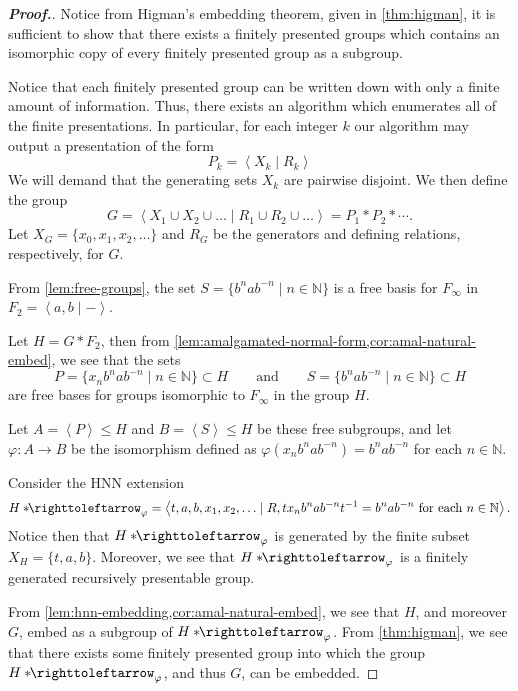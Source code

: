 \documentclass[11pt,a4paper,reqno]{amsart}
\theoremstyle{plain}
\theoremstyle{definition}
\theoremstyle{definition}
\renewcommand\leq\leqslant
\newenvironment{myproof}{\begin{proof}[\normalfont\bfseries Proof.]}{\end{proof}}
\newcommand\hnn{*\!\!\righttoleftarrow}
\begin{document}
\begin{myproof}
	Notice from Higman's embedding theorem, given in \cref{thm:higman}, it is sufficient to show that there exists a finitely presented groups which contains an isomorphic copy of every finitely presented group as a subgroup.

	Notice that each finitely presented group can be written down with only a finite amount of information.
	Thus, there exists an algorithm which enumerates all of the finite presentations.
	In particular, for each integer $k$ our algorithm may output a presentation of the form
	\[
		P_k = \left\langle X_k\mid R_k  \right\rangle
	\]
	We will demand that the generating sets $X_k$ are pairwise disjoint.
	We then define the group
	\[
		G = \left\langle
		X_1 \cup X_2 \cup \ldots
		\mid
		R_1 \cup R_2\cup\ldots
		\right\rangle = P_1 * P_2 * \cdots.
	\]
  Let $X_G = \{x_0,x_1,x_2,\ldots\}$ and $R_G$ be the generators and  defining relations, respectively, for $G$.

	From \cref{lem:free-groups}, the set 
  $
      S = \{b^n a b^{-n} \mid n \in \mathbb N\}
  $
  is a free basis for $F_\infty$ in $F_2 = \left\langle a,b\mid - \right\rangle$.

  Let $H = G * F_2$, then from \cref{lem:amalgamated-normal-form,cor:amal-natural-embed}, we see that the sets
\[
  P = \{ x_n b^n a b^{-n} \mid n\in \mathbb N \}\subset H
  \qquad
  \text{and}
  \qquad
  S = \{ b^n a b^{-n} \mid n\in \mathbb N \}\subset H
\]
are free bases for groups isomorphic to $F_\infty$ in the group $H$.

Let $A = \left\langle P \right\rangle \leq H$ and $B= \left\langle S \right\rangle\leq H$ be these free subgroups, and let $\varphi\colon A\to B$ be the isomorphism defined as
$
  \varphi(x_n b^n a b^{-n}) = b^n a b^{-n}
$
for each $n\in \mathbb N$.

Consider the HNN extension
\[
  H\hnn_\varphi
  =
  \left\langle
    t,a,b,x_1,x_2,\ldots
  \mid
    R,
    t x_n b^n a b^{-n} t^{-1} = b^n a b^{-n}
  \text{ for each }n\in \mathbb N
  \right\rangle.
\]
Notice then that $H\hnn_\varphi$ is generated by the finite subset $X_H = \{t,a,b\}$.
Moreover, we see that $H\hnn_\varphi$ is a finitely generated recursively presentable group.

From \cref{lem:hnn-embedding,cor:amal-natural-embed}, we see that $H$, and moreover $G$, embed as a subgroup of $H \hnn_\varphi$.
From \cref{thm:higman}, we see that there exists some finitely presented group into which the group $H\hnn_\varphi$, and thus $G$, can be embedded.
\end{myproof}
\end{document}
